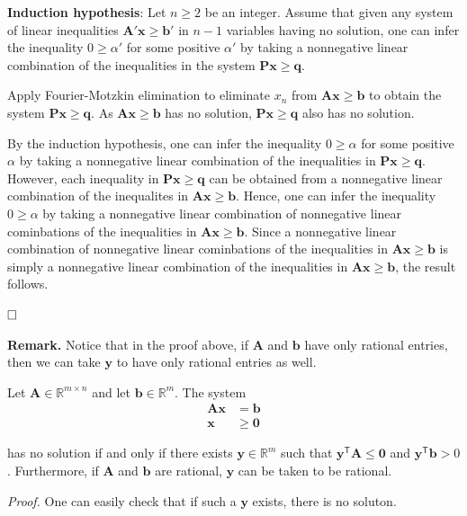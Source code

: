 \documentclass[]{book}
\def\gt{>}
\newcommand{\RR}{\mathbb{R}}
\newcommand{\T}{\mathsf{T}}
\newcommand{\mm}[1]{\mathbf{#1}}
\renewcommand{\vec}[1]{\mathbf{#1}}
\theoremstyle{definition}
\theoremstyle{definition}
\theoremstyle{remark}
\let\BeginKnitrBlock\begin \let\EndKnitrBlock\end
\begin{document}
\textbf{Induction hypothesis}: Let \(n \geq 2\) be an integer. Assume
that given any system of linear inequalities
\(\mm{A}'\vec{x} \geq \vec{b}'\) in \(n-1\) variables having no
solution, one can infer the inequality \(0 \geq \alpha'\) for some
positive \(\alpha'\) by taking a nonnegative linear combination of the
inequalities in the system \(\mm{P}\vec{x} \geq \vec{q}\).

Apply Fourier-Motzkin elimination to eliminate \(x_n\) from
\(\mm{A}\vec{x} \geq \vec{b}\) to obtain the system
\(\mm{P}\vec{x} \geq \vec{q}\). As \(\mm{A}\vec{x}\geq \vec{b}\) has no
solution, \(\mm{P}\vec{x} \geq \vec{q}\) also has no solution.

By the induction hypothesis, one can infer the inequality
\(0 \geq \alpha\) for some positive \(\alpha\) by taking a nonnegative
linear combination of the inequalities in
\(\mm{P}\vec{x} \geq \vec{q}\). However, each inequality in
\(\mm{P}\vec{x} \geq \vec{q}\) can be obtained from a nonnegative linear
combination of the inequalites in \(\mm{A}\vec{x} \geq \vec{b}\). Hence,
one can infer the inequality \(0 \geq \alpha\) by taking a nonnegative
linear combination of nonnegative linear cominbations of the
inequalities in \(\mm{A}\vec{x}\geq \vec{b}\). Since a nonnegative
linear combination of nonnegative linear cominbations of the
inequalities in \(\mm{A}\vec{x}\geq \vec{b}\) is simply a nonnegative
linear combination of the inequalities in \(\mm{A}\vec{x}\geq \vec{b}\),
the result follows.

\(\qed\)

\textbf{Remark.} Notice that in the proof above, if \(\mm{A}\) and
\(\vec{b}\) have only rational entries, then we can take \(\vec{y}\) to
have only rational entries as well.

\BeginKnitrBlock{corollary}
\protect\hypertarget{cor:farkas-std-eq}{}{\label{cor:farkas-std-eq}} Let
\(\mm{A} \in \RR^{m\times n}\) and let \(\vec{b} \in \RR^m\). The system
\begin{align*}
    \mm{A}\vec{x} & = \vec{b} \\
    \vec{x} & \geq \vec{0}
    \end{align*}

has no solution if and only if there exists \(\vec{y} \in \RR^m\) such
that \(\vec{y}^\T \mm{A} \leq \vec{0}\) and \(\vec{y}^\T\vec{b} \gt 0\).
Furthermore, if \(\mm{A}\) and \(\vec{b}\) are rational, \(\vec{y}\) can
be taken to be rational.
\EndKnitrBlock{corollary}

\emph{Proof.} One can easily check that if such a \(\vec{y}\) exists,
there is no soluton.
\end{document}
